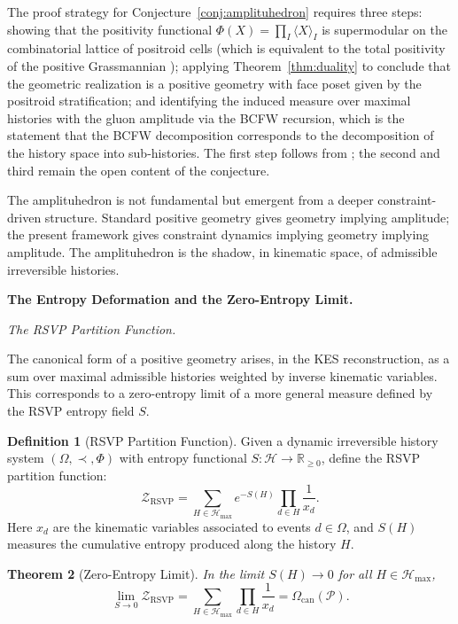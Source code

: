 \documentclass[11pt]{article}
\theoremstyle{plain}
\newtheorem{theorem}{Theorem}[section]
\theoremstyle{definition}
\newtheorem{definition}[theorem]{Definition}
\theoremstyle{remark}
\newcommand{\R}{\mathbb{R}}
\newcommand{\Phif}{\Phi}
\newcommand{\Sf}{S}
\newcommand{\OmKS}{\Omega}
\newcommand{\CF}{\Omega_{\mathrm{can}}}
\newcommand{\ZRSVP}{\mathcal{Z}_{\mathrm{RSVP}}}
\newcommand{\Hmax}{\mathcal{H}_{\max}}
\begin{document}
The proof strategy for Conjecture~\ref{conj:amplituhedron} requires three steps: showing that the positivity functional $\Phif(X) = \prod_I \langle X \rangle_I$ is supermodular on the combinatorial lattice of positroid cells (which is equivalent to the total positivity of the positive Grassmannian \cite{Postnikov2006}); applying Theorem~\ref{thm:duality} to conclude that the geometric realization is a positive geometry with face poset given by the positroid stratification; and identifying the induced measure over maximal histories with the gluon amplitude via the BCFW recursion, which is the statement that the BCFW decomposition corresponds to the decomposition of the history space into sub-histories. The first step follows from \cite{Postnikov2006}; the second and third remain the open content of the conjecture.

The amplituhedron is not fundamental but emergent from a deeper constraint-driven structure. Standard positive geometry gives geometry implying amplitude; the present framework gives constraint dynamics implying geometry implying amplitude. The amplituhedron is the shadow, in kinematic space, of admissible irreversible histories.

\bigskip\noindent\textbf{The Entropy Deformation and the Zero-Entropy Limit.}
\label{sec:entropy}

\medskip\noindent\textit{The RSVP Partition Function.}

The canonical form of a positive geometry arises, in the KES reconstruction, as a sum over maximal admissible histories weighted by inverse kinematic variables. This corresponds to a zero-entropy limit of a more general measure defined by the RSVP entropy field $\Sf$.

\begin{definition}[RSVP Partition Function]
Given a dynamic irreversible history system $(\OmKS, \prec, \Phif)$ with entropy functional $\Sf: \mathcal{H} \to \R_{\geq 0}$, define the RSVP partition function:
\begin{equation}
\label{eq:rsvp-partition}
  \ZRSVP = \sum_{H \in \Hmax} e^{-\Sf(H)} \prod_{d \in H} \frac{1}{x_d}.
\end{equation}
Here $x_d$ are the kinematic variables associated to events $d \in \OmKS$, and $\Sf(H)$ measures the cumulative entropy produced along the history $H$.
\end{definition}

\begin{theorem}[Zero-Entropy Limit]
\label{thm:zero-entropy}
In the limit $\Sf(H) \to 0$ for all $H \in \Hmax$,
\[
  \lim_{\Sf \to 0} \ZRSVP = \sum_{H \in \Hmax} \prod_{d \in H} \frac{1}{x_d} = \CF(\mathcal{P}).
\]
\end{theorem}
\end{document}
